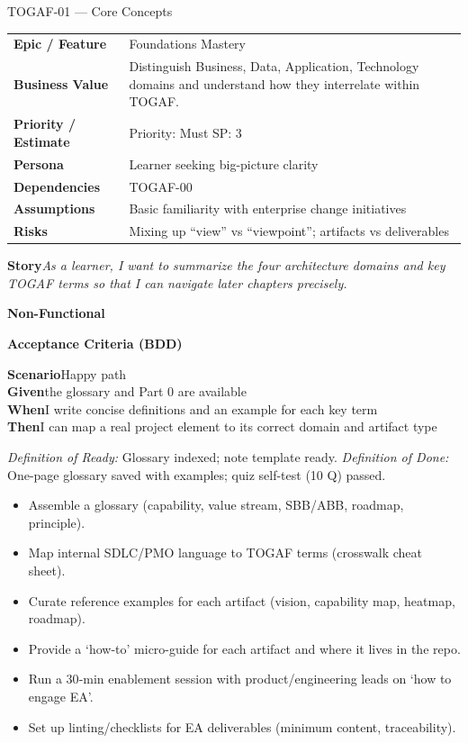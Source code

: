 \documentclass[11pt,a4paper]{article}
\newcommand{\Tag}[1]{%
  \tcbox[
    on line, rounded corners,
    colback=chipback, colframe=chipborder,
    boxrule=0.3pt, left=5pt, right=5pt, top=2pt, bottom=2pt]{\footnotesize #1}%
}
\newlength{\StoryLabelWidth}
\newlength{\StoryValueWidth}
\newcommand{\Field}[2]{\textbf{#1} & #2\\}
\newcommand{\StoryText}[1]{\textbf{Story}\quad \textit{#1}}
\newcommand{\NonFunctional}[1]{\textbf{Non-Functional}\quad #1}
\newcommand{\BDDHeader}{\textbf{Acceptance Criteria (BDD)}}
\newcommand{\BDDRow}[2]{\textbf{#1}\quad #2}
\newcommand{\DOR}[1]{\textit{\footnotesize Definition of Ready:} #1}
\newcommand{\DOD}[1]{\textit{\footnotesize Definition of Done:} #1}
\newcommand{\Task}[1]{\item[$\square$] #1}
\providecommand{\Field}[2]{\textbf{#1} & #2\\}
\begin{document}
\clearpage

\begin{StoryCard}{TOGAF-01 — Core Concepts}
\par\setlength{\StoryLabelWidth}{0.27\linewidth}%
\setlength{\StoryValueWidth}{\dimexpr\linewidth-\StoryLabelWidth-2\tabcolsep-10pt\relax}%
\noindent\begin{tabular}{@{}>{\RaggedRight\arraybackslash\bfseries}p{\StoryLabelWidth}>{\RaggedRight\arraybackslash}p{\StoryValueWidth}@{}}
  \Field{Epic / Feature}{Foundations Mastery}
  \Field{Business Value}{Distinguish Business, Data, Application, Technology domains and understand how they interrelate within TOGAF.}
  \Field{Priority / Estimate}{Priority: Must \quad\quad SP: 3}
  \Field{Persona}{Learner seeking big-picture clarity}
  \Field{Dependencies}{TOGAF-00}
  \Field{Assumptions}{Basic familiarity with enterprise change initiatives}
  \Field{Risks}{Mixing up ``view'' vs ``viewpoint''; artifacts vs deliverables}
\end{tabular}\par

\vspace{4pt}
\StoryText{As a learner, I want to summarize the four architecture domains and key TOGAF terms so that I can navigate later chapters precisely.}

\vspace{2pt}
\NonFunctional{\Tag{Terminology} \Tag{Clarity} \Tag{Traceability}}

\vspace{6pt}
\BDDHeader

\BDDRow{Scenario}{Happy path}\\
\BDDRow{Given}{the glossary and Part 0 are available}\\
\BDDRow{When}{I write concise definitions and an example for each key term}\\
\BDDRow{Then}{I can map a real project element to its correct domain and artifact type}

\vspace{6pt}
\DOR{Glossary indexed; note template ready.}\quad
\DOD{One-page glossary saved with examples; quiz self-test (10 Q) passed.}
\end{StoryCard}
\begin{TasksBox}
\begin{itemize}[label={}, leftmargin=*]
\Task{Assemble a glossary (capability, value stream, SBB/ABB, roadmap, principle).}
\Task{Map internal SDLC/PMO language to TOGAF terms (crosswalk cheat sheet).}
\Task{Curate reference examples for each artifact (vision, capability map, heatmap, roadmap).}
\Task{Provide a ‘how-to’ micro-guide for each artifact and where it lives in the repo.}
\Task{Run a 30‑min enablement session with product/engineering leads on ‘how to engage EA’.}
\Task{Set up linting/checklists for EA deliverables (minimum content, traceability).}
\end{itemize}
\end{TasksBox}
\end{document}
